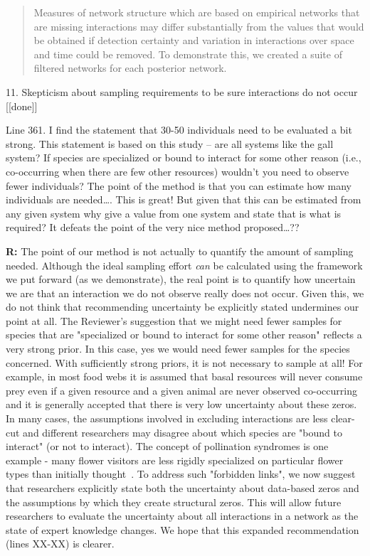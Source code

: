 \documentclass[12pt]{letter}
\newenvironment{refquote}{\bigskip \begin{it}}{\end{it}\smallskip}
\begin{document}
		\begin{quotation}
			Measures of network structure which are based on empirical networks that are missing interactions may differ substantially from the values that would be obtained if detection certainty and variation in interactions over space and time could be removed. To demonstrate this, we created a suite of filtered networks for each posterior network. 
		\end{quotation}


	11. Skepticism about sampling requirements to be sure interactions do not occur [[done]]

		\begin{refquote}
		Line 361.  I find the statement that 30-50 individuals need to be evaluated a bit strong.  This statement is based on this study – are all systems like the gall system?  If species are specialized or bound to interact for some other reason (i.e., co-occurring when there are few other resources) wouldn’t you need to observe fewer individuals?  The point of the method is that you can estimate how many individuals are needed…. This is great!  But given that this can be estimated from any given system why give a value from one system and state that is what is required?  It defeats the point of the very nice method proposed…??
		\end{refquote}

		\textbf{R:} The point of our method is not actually to quantify the amount of sampling needed. Although the ideal sampling effort \emph{can} be calculated using the framework we put forward (as we demonstrate), the real point is to quantify how uncertain we are that an interaction we do not observe really does not occur. Given this, we do not think that recommending uncertainty be explicitly stated undermines our point at all. 
		\smallskip
		The Reviewer's suggestion that we might need fewer samples for species that are "specialized or bound to interact for some other reason" reflects a very strong prior. In this case, yes we would need fewer samples for the species concerned. With sufficiently strong priors, it is not necessary to sample at all! For example, in most food webs it is assumed that basal resources will never consume prey even if a given resource and a given animal are never observed co-occurring and it is generally accepted that there is very low uncertainty about these zeros. In many cases, the assumptions involved in excluding interactions are less clear-cut and different researchers may disagree about which species are "bound to interact" (or not to interact). The concept of pollination syndromes is one example - many flower visitors are less rigidly specialized on particular flower types than initially thought~\citep{Ollerton2009}. To address such "forbidden links", we now suggest that researchers explicitly state both the uncertainty about data-based zeros and the assumptions by which they create structural zeros. This will allow future researchers to evaluate the uncertainty about all interactions in a network as the state of expert knowledge changes. We hope that this expanded recommendation (lines XX-XX) is clearer.
\end{document}
